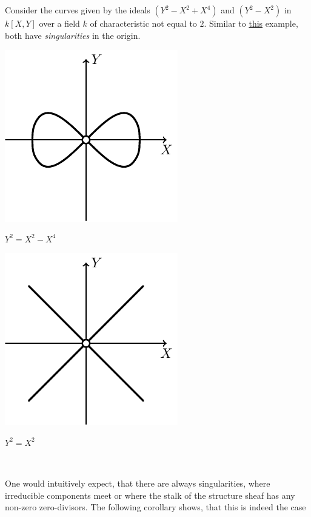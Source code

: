 \documentclass[a4paper,parskip=half,numbers=enddot, DIV=12]{scrreprt}
\begin{document}
\begin{example*}%
    Consider the curves given by the ideals $(Y^2-X^2+X^4)$ and $(Y^2-X^2)$ in $k[X,Y]$ over a field $k$ of characteristic not equal to $2$. Similar to \hyperref[ex:singularPoints]{this} example, both have \emph{singularities} in the origin.
     \begin{center}
    	\begin{minipage}{0.42\textwidth}
    		\centering
    		\includegraphics{Curve3.pdf}
    		
    		$Y^2=X^2-X^4$
    	\end{minipage}
    	\begin{minipage}{0.42\textwidth}
    		\centering
    		\includegraphics{Curve4.pdf}
    		
    		$Y^2=X^2$
    	\end{minipage}\\    	
    	\phantom{we need more space}
    \end{center}    
\end{example*}
One would intuitively expect, that there are always singularities, where irreducible components meet or where the stalk of the structure sheaf has any non-zero zero-divisors. The following corollary shows, that this is indeed the case
\end{document}
